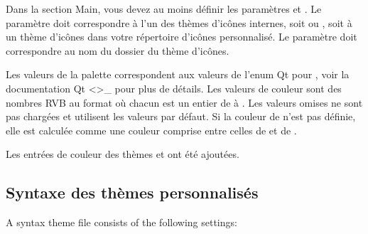 \documentclass[a4paper,11pt,french]{sphinxmanual}
\begin{document}
\sphinxAtStartPar
Dans la section Main, vous devez au moins définir les paramètres  et . Le paramètre  doit correspondre à l’un des thèmes d’icônes internes, soit  ou , soit à un thème d’icônes dans votre répertoire d’icônes personnalisé. Le paramètre doit correspondre au nom du dossier du thème d’icônes.

\sphinxAtStartPar
Les valeurs de la palette correspondent aux valeurs de l’enum Qt pour , voir la documentation Qt \textless{}\textgreater{}\textasciigrave{}\_ pour plus de détails. Les valeurs de couleur sont des nombres RVB au format  où chacun est un entier de  à . Les valeurs omises ne sont pas chargées et utilisent les valeurs par défaut. Si la couleur de  n’est pas définie, elle est calculée comme une couleur comprise entre celles de  et de .

\sphinxAtStartPar
{}Les entrées de couleur des thèmes  et  ont été ajoutées.


\subsection{Syntaxe des thèmes personnalisés}
\label{\detokenize{more_customise:custom-syntax-theme}}
\sphinxAtStartPar
A syntax theme  file consists of the following settings:
\end{document}

